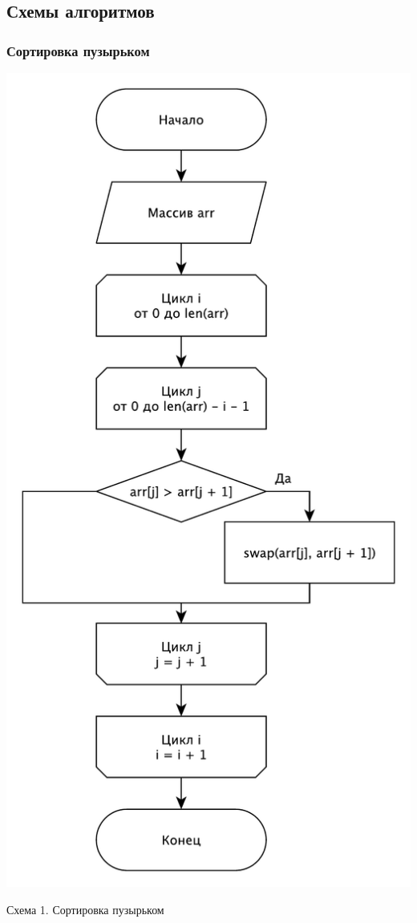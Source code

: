 \documentclass[a4paper,12pt]{article}
\begin{document}
\subsection{Схемы алгоритмов}

\subsubsection{Сортировка пузырьком}

\begin{center}
    \includegraphics[scale=0.55]{Bubble}

    Схема 1. Сортировка пузырьком
\end{center}
\end{document}
